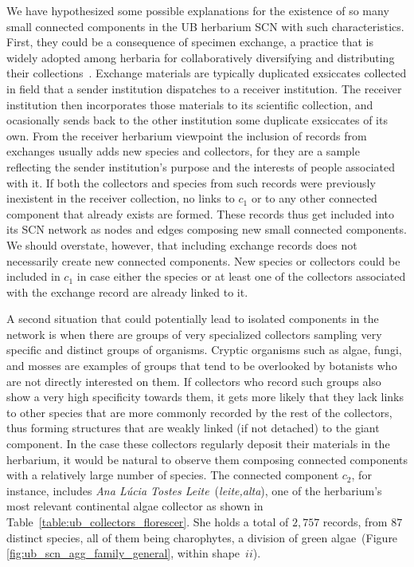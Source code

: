 We have hypothesized some possible explanations for the existence of so many small connected components in the UB herbarium SCN with such characteristics. First, they could be a consequence of specimen exchange, a practice that is widely adopted among herbaria for collaboratively diversifying and distributing their collections~\cite{Groom2014}. Exchange materials are typically duplicated exsiccates collected in field that a sender institution dispatches to a receiver institution. The receiver institution then incorporates those materials to its scientific collection, and ocasionally sends back to the other institution some duplicate exsiccates of its own.
From the receiver herbarium viewpoint the inclusion of records from exchanges usually adds new species and collectors, for they are a sample reflecting the sender institution's purpose and the interests of people associated with it. If both the collectors and species from such records were previously inexistent in the receiver collection, no links to $c_1$ or to any other connected component that already exists are formed. These records thus get included into its SCN network as nodes and edges composing new small connected components. We should overstate, however, that including exchange records does not necessarily create new connected components. New species or collectors could be included in $c_1$ in case either the species or at least one of the collectors associated with the exchange record are already linked to it.

A second situation that could potentially lead to isolated components in the network is when there are groups of very specialized collectors sampling very specific and distinct groups of organisms. 
Cryptic organisms such as algae, fungi, and mosses are examples of groups that tend to be overlooked by botanists who are not directly interested on them. 
If collectors who record such groups also show a very high specificity towards them, it gets more likely that they lack links to other species that are more commonly recorded by the rest of the collectors, thus forming structures that are weakly linked (if not detached) to the giant component. 
In the case these collectors regularly deposit their materials in the herbarium, it would be natural to observe them composing connected components with a relatively large number of species.
The connected component $c_2$, for instance, includes \textit{Ana Lúcia Tostes Leite}~(\textit{leite,alta}), one of the herbarium's most relevant continental algae collector as shown in Table~\ref{table:ub_collectors_florescer}.
She holds a total of $2,757$ records, from $87$ distinct species, all of them being charophytes, a division of green algae~(Figure \ref{fig:ub_scn_agg_family_general}, within shape~$ii$).

